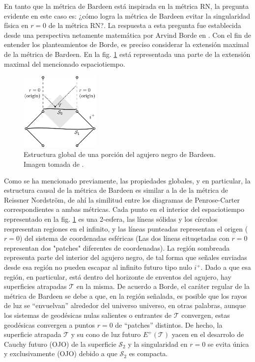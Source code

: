 \documentclass{article}
\numberwithin{equation}{section}
\theoremstyle{definition}
\begin{document}
En tanto que la métrica de Bardeen está inspirada en la métrica RN, la pregunta evidente en este caso es: ¿cómo logra la métrica de Bardeen evitar la singularidad física en $r = 0$ de la métrica RN?. La respuesta a esta pregunta fue establecida desde una perspectiva netamente matemática por Arvind Borde en \cite{borde1994,borde1996}. Con el fin de entender los planteamientos de Borde, es preciso considerar la extensión maximal de la métrica de Bardeen. En la fig. \ref{fig: bardeen diagram} está representada una parte de la extensión maximal del mencionado espaciotiempo.

\begin{figure}[h!]
	\centering
	\includegraphics[width=0.35\textwidth]{bardeenDiagram}
	\caption{Estructura global de una porción del agujero negro de Bardeen. Imagen tomada de \cite{borde1994}.}
	\label{fig: bardeen diagram}
\end{figure}

Como se ha mencionado previamente, las propiedades globales, y en particular, la estructura causal de la métrica de Bardeen es similar a la de la métrica de Reissner Nordström, de ahí la similitud entre los diagramas de Penrose-Carter correspondientes a ambas métricas. Cada punto en el interior del espaciotiempo representado en la fig. \ref{fig: bardeen diagram} es una 2-esfera, las líneas sólidas y los círculos respresentan regiones en el infinito, y las líneas punteadas representan el origen ($r = 0$) del sistema de coordenadas esféricas (Las dos líneas eituqetadas con $r = 0$ representan dos "patches" diferentes de coordenadas). La región sombreada representa parte del interior del agujero negro, de tal forma que señales enviadas desde esa región no pueden escapar al infinito futuro tipo nulo $i^{+}$. Dado a que esa región, en particular, está dentro del horizonte de enventos del agujero, hay superficies atrapadas $\mathcal{T}$ en la misma. De acuerdo a Borde, el caráter regular de la métrica de Bardeen se debe a que, en la región señalada, es posible que los rayos de luz se ``envuelvan'' alrededor del universo universo, en otras palabras, aunque los sistemas de geodésicas nulas salientes o entrantes de $\mathcal{T}$ convergen, estas geodésicas convergen a puntos $r = 0$ de ``patches'' distintos. De hecho, la superficie atrapada $\mathcal{T}$ y su cono de luz futuro $E^{+}(\mathcal{T})$ yacen en el desarrolo de Cauchy futuro (OJO) de la superficie $\mathcal{S}_{2}$ y la singularidad en $r = 0$ se evita única y exclusivamente (OJO) debido a que $\mathcal{S}_{2}$ es compacta.\\
\end{document}
